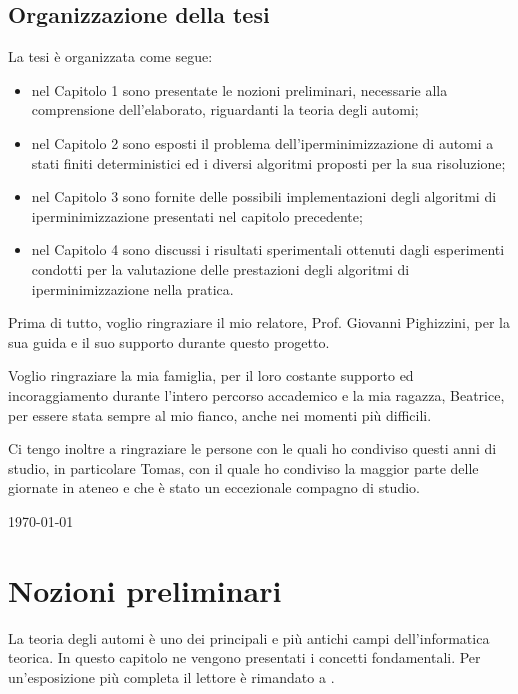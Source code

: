 \documentclass[a4paper,12pt]{report} %
\begin{document}
\section{Organizzazione della tesi}
\label{organizzazione}
La tesi è organizzata come segue:
\begin{itemize}
  \item nel Capitolo 1 sono presentate le nozioni preliminari, necessarie alla comprensione dell'elaborato,
  riguardanti la teoria degli automi;
  \item nel Capitolo 2 sono esposti il problema dell'iperminimizzazione di automi a stati finiti deterministici
  ed i diversi algoritmi proposti per la sua risoluzione;
  \item nel Capitolo 3 sono fornite delle possibili implementazioni degli algoritmi di iperminimizzazione
  presentati nel capitolo precedente;
  \item nel Capitolo 4 sono discussi i risultati sperimentali ottenuti dagli esperimenti condotti per la valutazione
  delle prestazioni degli algoritmi di iperminimizzazione nella pratica.
\end{itemize}



Prima di tutto, voglio ringraziare il mio relatore, Prof. Giovanni Pighizzini,
per la sua guida e il suo supporto durante questo progetto.

Voglio ringraziare la mia famiglia, per il loro costante supporto ed incoraggiamento
durante l'intero percorso accademico e la mia ragazza, Beatrice, per essere stata sempre al mio fianco,
anche nei momenti più difficili.

Ci tengo inoltre a ringraziare le persone con le quali ho condiviso questi anni di studio, in particolare
Tomas, con il quale ho condiviso la maggior parte delle giornate in ateneo e che è stato un eccezionale
compagno di studio.

\hfill \today


\afterpreface


\chapter{Nozioni preliminari}
\label{cap1}

La teoria degli automi è uno dei principali e più antichi campi dell'informatica teorica. In questo capitolo
ne vengono presentati i concetti fondamentali. Per un'esposizione più completa il lettore è rimandato a \parencite{HMU06}.
\end{document}
